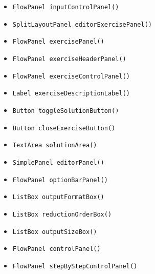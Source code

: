 \begin{itemize}
\item \texttt{FlowPanel inputControlPanel()}



\item \texttt{SplitLayoutPanel editorExercisePanel()}



\item \texttt{FlowPanel exercisePanel()}



\item \texttt{FlowPanel exerciseHeaderPanel()}



\item \texttt{FlowPanel exerciseControlPanel()}



\item \texttt{Label exerciseDescriptionLabel()}



\item \texttt{Button toggleSolutionButton()}



\item \texttt{Button closeExerciseButton()}



\item \texttt{TextArea solutionArea()}



\item \texttt{SimplePanel editorPanel()}



\item \texttt{FlowPanel optionBarPanel()}



\item \texttt{ListBox outputFormatBox()}



\item \texttt{ListBox reductionOrderBox()}



\item \texttt{ListBox outputSizeBox()}



\item \texttt{FlowPanel controlPanel()}



\item \texttt{FlowPanel stepByStepControlPanel()}




\end{itemize}
